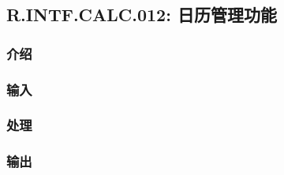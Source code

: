 \subsection{R.INTF.CALC.012: 日历管理功能}
\subsubsection{介绍}
\subsubsection{输入}
\subsubsection{处理}
\subsubsection{输出}